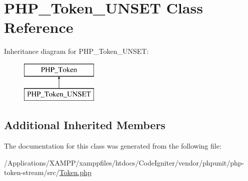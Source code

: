 \hypertarget{class_p_h_p___token___u_n_s_e_t}{}\section{P\+H\+P\+\_\+\+Token\+\_\+\+U\+N\+S\+ET Class Reference}
\label{class_p_h_p___token___u_n_s_e_t}
Inheritance diagram for P\+H\+P\+\_\+\+Token\+\_\+\+U\+N\+S\+ET\+:\begin{figure}[H]
\begin{center}
\leavevmode
\includegraphics[height=2.000000cm]{class_p_h_p___token___u_n_s_e_t}
\end{center}
\end{figure}
\subsection*{Additional Inherited Members}


The documentation for this class was generated from the following file\+:\begin{DoxyCompactItemize}
\item 
/\+Applications/\+X\+A\+M\+P\+P/xamppfiles/htdocs/\+Code\+Igniter/vendor/phpunit/php-\/token-\/stream/src/\mbox{\hyperlink{_token_8php}{Token.\+php}}\end{DoxyCompactItemize}
